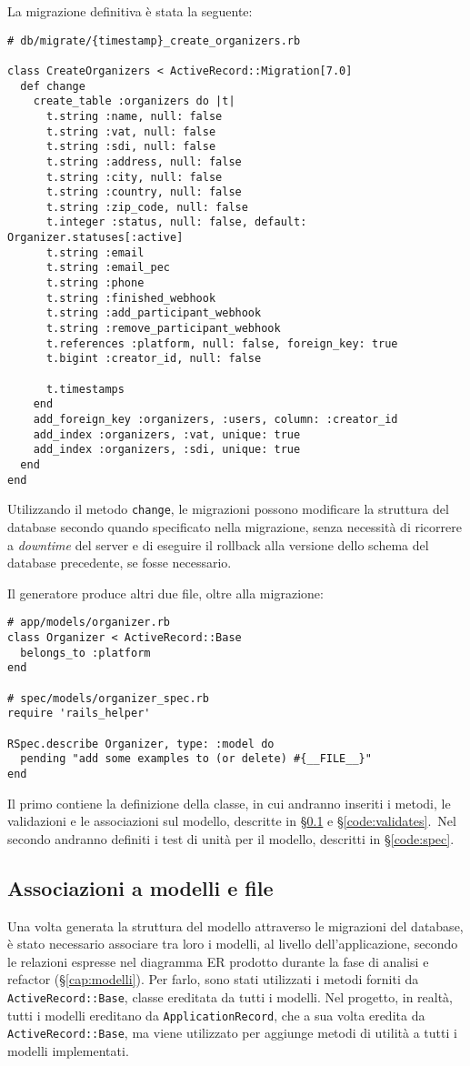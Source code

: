 La migrazione definitiva è stata la seguente:
\begin{verbatim}
# db/migrate/{timestamp}_create_organizers.rb

class CreateOrganizers < ActiveRecord::Migration[7.0]
  def change
    create_table :organizers do |t|
      t.string :name, null: false
      t.string :vat, null: false
      t.string :sdi, null: false
      t.string :address, null: false
      t.string :city, null: false
      t.string :country, null: false
      t.string :zip_code, null: false
      t.integer :status, null: false, default: Organizer.statuses[:active]
      t.string :email
      t.string :email_pec
      t.string :phone
      t.string :finished_webhook
      t.string :add_participant_webhook
      t.string :remove_participant_webhook
      t.references :platform, null: false, foreign_key: true
      t.bigint :creator_id, null: false

      t.timestamps
    end
    add_foreign_key :organizers, :users, column: :creator_id
    add_index :organizers, :vat, unique: true
    add_index :organizers, :sdi, unique: true
  end
end
\end{verbatim}
Utilizzando il metodo \verb|change|, le migrazioni possono modificare la struttura del database secondo quando specificato nella migrazione, senza necessità di ricorrere a \emph{downtime} del server e di eseguire il rollback alla versione dello schema del database precedente, se fosse necessario.

Il generatore produce altri due file, oltre alla migrazione:
\begin{verbatim}
# app/models/organizer.rb
class Organizer < ActiveRecord::Base
  belongs_to :platform
end

# spec/models/organizer_spec.rb
require 'rails_helper'

RSpec.describe Organizer, type: :model do
  pending "add some examples to (or delete) #{__FILE__}"
end
\end{verbatim}
Il primo contiene la definizione della classe, in cui andranno inseriti i metodi, le validazioni e le associazioni sul modello, descritte in \S \ref{code:association} e \S \ref{code:validates}.\ Nel secondo andranno definiti i test di unità per il modello, descritti in \S \ref{code:spec}.

\subsection{Associazioni a modelli e file} \label{code:association}
Una volta generata la struttura del modello attraverso le migrazioni del database, è stato necessario associare tra loro i modelli, al livello dell'applicazione, secondo le relazioni espresse nel diagramma ER prodotto durante la fase di analisi e refactor (\S \ref{cap:modelli}). Per farlo, sono stati utilizzati i metodi forniti da \verb|ActiveRecord::Base|, classe ereditata da tutti i modelli. Nel progetto, in realtà, tutti i modelli ereditano da \verb|ApplicationRecord|, che a sua volta eredita da \verb|ActiveRecord::Base|, ma viene utilizzato per aggiunge metodi di utilità a tutti i modelli implementati.

